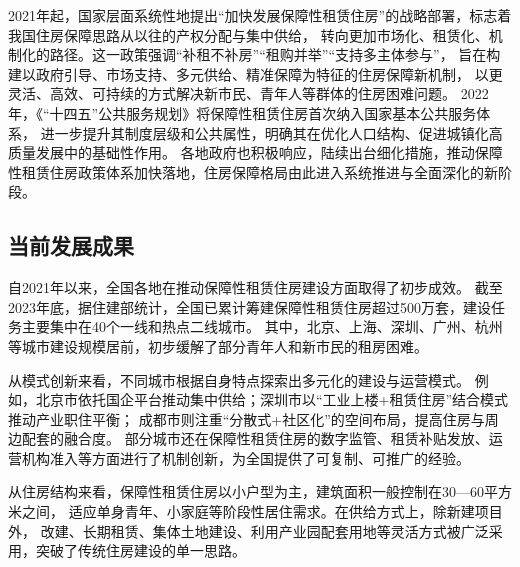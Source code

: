 2021年起，国家层面系统性地提出“加快发展保障性租赁住房”的战略部署，标志着我国住房保障思路从以往的产权分配与集中供给，
转向更加市场化、租赁化、机制化的路径。这一政策强调“补租不补房”“租购并举”“支持多主体参与”，
旨在构建以政府引导、市场支持、多元供给、精准保障为特征的住房保障新机制，
以更灵活、高效、可持续的方式解决新市民、青年人等群体的住房困难问题。
2022年，《“十四五”公共服务规划》将保障性租赁住房首次纳入国家基本公共服务体系，
进一步提升其制度层级和公共属性，明确其在优化人口结构、促进城镇化高质量发展中的基础性作用。
各地政府也积极响应，陆续出台细化措施，推动保障性租赁住房政策体系加快落地，住房保障格局由此进入系统推进与全面深化的新阶段。

\subsection{当前发展成果}
自2021年以来，全国各地在推动保障性租赁住房建设方面取得了初步成效。
截至2023年底，据住建部统计，全国已累计筹建保障性租赁住房超过500万套，建设任务主要集中在40个一线和热点二线城市。
其中，北京、上海、深圳、广州、杭州等城市建设规模居前，初步缓解了部分青年人和新市民的租房困难。

从模式创新来看，不同城市根据自身特点探索出多元化的建设与运营模式。
例如，北京市依托国企平台推动集中供给；深圳市以“工业上楼+租赁住房”结合模式推动产业职住平衡；
成都市则注重“分散式+社区化”的空间布局，提高住房与周边配套的融合度。
部分城市还在保障性租赁住房的数字监管、租赁补贴发放、运营机构准入等方面进行了机制创新，为全国提供了可复制、可推广的经验。

从住房结构来看，保障性租赁住房以小户型为主，建筑面积一般控制在30—60平方米之间，
适应单身青年、小家庭等阶段性居住需求。在供给方式上，除新建项目外，
改建、长期租赁、集体土地建设、利用产业园配套用地等灵活方式被广泛采用，突破了传统住房建设的单一思路。